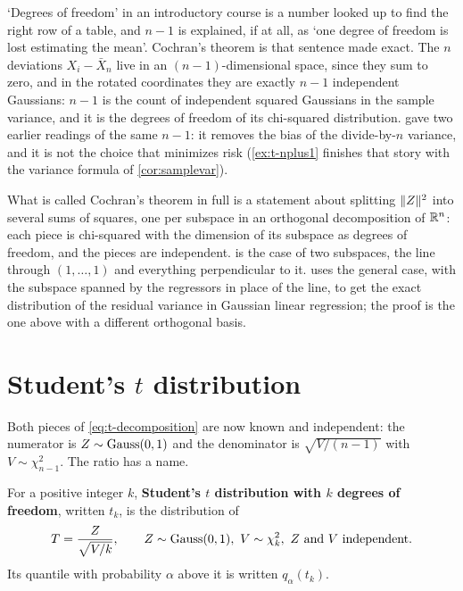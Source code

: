 \begin{bridge}
`Degrees of freedom' in an introductory course is a number looked up to find the right row of a table, and $n - 1$ is explained, if at all, as `one degree of freedom is lost estimating the mean'.
Cochran's theorem is that sentence made exact.
The $n$ deviations $X_i - \bar{X}_n$ live in an $(n-1)$-dimensional space, since they sum to zero, and in the rotated coordinates they are exactly $n - 1$ independent Gaussians: $n - 1$ is the count of independent squared Gaussians in the sample variance, and it is the degrees of freedom of its chi-squared distribution.
 gave two earlier readings of the same $n - 1$: it removes the bias of the divide-by-$n$ variance, and it is not the choice that minimizes risk (\cref{ex:t-nplus1} finishes that story with the variance formula of \cref{cor:samplevar}).
\end{bridge}

\begin{remark}
What is called Cochran's theorem in full is a statement about splitting $\lVert Z\rVert^2$ into several sums of squares, one per subspace in an orthogonal decomposition of $\mathbb{R}^n$: each piece is chi-squared with the dimension of its subspace as degrees of freedom, and the pieces are independent.
 is the case of two subspaces, the line through $(1, \ldots, 1)$ and everything perpendicular to it.
 uses the general case, with the subspace spanned by the regressors in place of the line, to get the exact distribution of the residual variance in Gaussian linear regression; the proof is the one above with a different orthogonal basis.
\end{remark}

\section{Student's \texorpdfstring{$t$}{t} distribution}
\label{sec:t-student}

Both pieces of \eqref{eq:t-decomposition} are now known and independent: the numerator is $Z \sim \text{Gauss}(0,1)$ and the denominator is $\sqrt{V/(n-1)}$ with $V \sim \chi^2_{n-1}$.
The ratio has a name.

\begin{definition}
\label{def:student}
For a positive integer $k$, \textbf{Student's $t$ distribution with $k$ degrees of freedom}, written $t_k$, is the distribution of
\[
T = \frac{Z}{\sqrt{V/k}}, \qquad Z \sim \text{Gauss}(0,1),\ V \sim \chi^2_k,\ Z \text{ and } V \text{ independent}.
\]
Its quantile with probability $\alpha$ above it is written $q_\alpha(t_k)$.
\end{definition}


